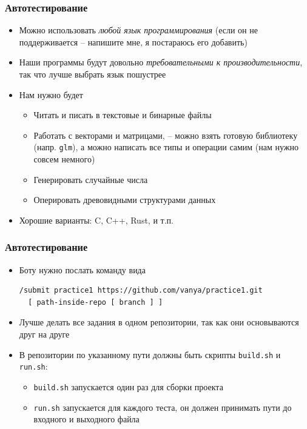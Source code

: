 \documentclass[10pt]{beamer}
\begin{document}
\begin{frame}[fragile]
\frametitle{Автотестирование}
\begin{itemize}
\item Можно использовать \textit{любой язык программирования} (если он не поддерживается -- напишите мне, я постараюсь его добавить)
\pause
\item Наши программы будут довольно \textit{требовательными к производительности}, так что лучше выбрать язык пошустрее
\pause
\item Нам нужно будет
\pause
\begin{itemize}
\item Читать и писать в текстовые и бинарные файлы
\pause
\item Работать с векторами и матрицами, -- можно взять готовую библиотеку (напр. \texttt{glm}), а можно написать все типы и операции самим (нам нужно совсем немного)
\pause
\item Генерировать случайные числа
\pause
\item Оперировать древовидными структурами данных
\end{itemize}
\pause
\item Хорошие варианты: C, C++, Rust, и т.п.
\end{itemize}
\end{frame}

\begin{frame}[fragile]
\frametitle{Автотестирование}
\begin{itemize}
\item Боту нужно послать команду вида
\begin{verbatim}
/submit practice1 https://github.com/vanya/practice1.git
  [ path-inside-repo [ branch ] ]
\end{verbatim}
\pause
\item Лучше делать все задания в одном репозитории, так как они основываются друг на друге
\pause
\item В репозитории по указанному пути должны быть скрипты \texttt{build.sh} и \texttt{run.sh}:
\begin{itemize}
\item \texttt{build.sh} запускается один раз для сборки проекта
\item \texttt{run.sh} запускается для каждого теста, он должен принимать пути до входного и выходного файла
\end{itemize}
\end{itemize}
\end{frame}
\end{document}
